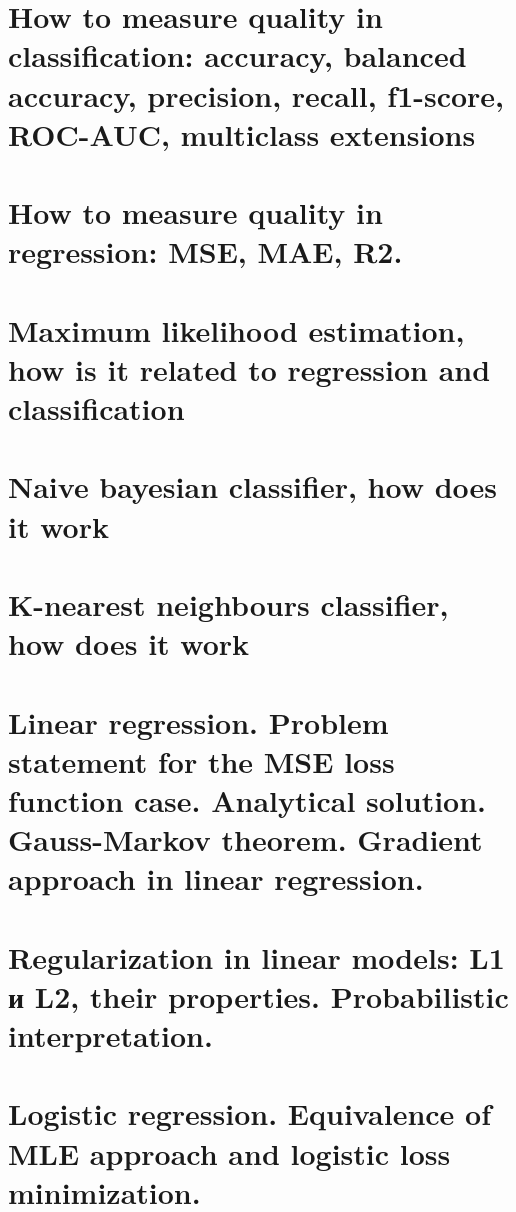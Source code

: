 \section{How to measure quality in classification: accuracy, balanced accuracy, precision, recall, f1-score, ROC-AUC, multiclass extensions}


\section{How to measure quality in regression: MSE, MAE, R2.}


\section{ Maximum likelihood estimation, how is it related to regression and classification}


\section{Naive bayesian classifier, how does it work}


\section{K-nearest neighbours classifier, how does it work}


\section{Linear regression. Problem statement for the MSE loss function case. Analytical solution. Gauss-Markov theorem. Gradient approach in linear regression.}


\section{Regularization in linear models: L1 и L2, their properties. Probabilistic interpretation.}


\section{Logistic regression. Equivalence of MLE approach and logistic loss minimization.}


